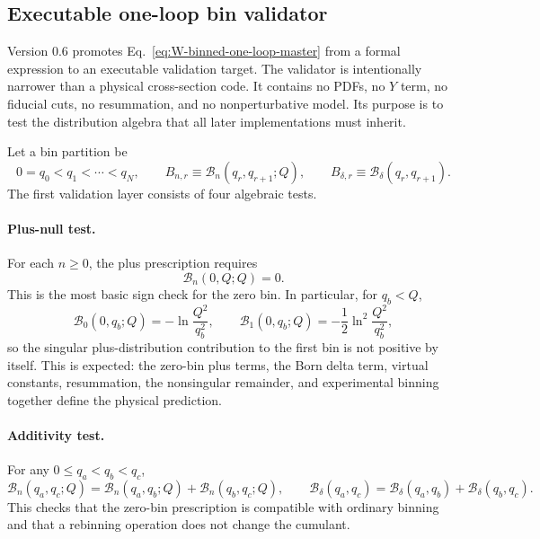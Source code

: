 \documentclass[11pt]{article}
\begin{document}
\subsection{Executable one-loop bin validator}
\label{subsec:one-loop-bin-validator}

Version 0.6 promotes Eq.~\eqref{eq:W-binned-one-loop-master} from a formal expression to
an executable validation target.  The validator is intentionally narrower than a physical
cross-section code. It contains no PDFs, no $Y$ term, no fiducial cuts, no resummation, and
no nonperturbative model. Its purpose is to test the distribution algebra that all later
implementations must inherit.

Let a bin partition be
\begin{equation}
  0=q_0<q_1<\cdots<q_N,
  \qquad
  B_{n,r}\equiv \mathcal B_n(q_r,q_{r+1};Q),
  \qquad
  B_{\delta,r}\equiv \mathcal B_\delta(q_r,q_{r+1}).
  \label{eq:bin-array-def}
\end{equation}
The first validation layer consists of four algebraic tests.

\paragraph{Plus-null test.}
For each $n\ge0$, the plus prescription requires
\begin{equation}
  \mathcal B_n(0,Q;Q)=0.
  \label{eq:plus-null-test}
\end{equation}
This is the most basic sign check for the zero bin.  In particular, for $q_b<Q$,
\begin{equation}
  \mathcal B_0(0,q_b;Q)=-\ln\frac{Q^2}{q_b^2},
  \qquad
  \mathcal B_1(0,q_b;Q)=-\frac{1}{2}\ln^2\frac{Q^2}{q_b^2},
  \label{eq:first-bin-negative}
\end{equation}
so the singular plus-distribution contribution to the first bin is not positive by itself.
This is expected: the zero-bin plus terms, the Born delta term, virtual constants,
resummation, the nonsingular remainder, and experimental binning together define the
physical prediction.

\paragraph{Additivity test.}
For any $0\le q_a<q_b<q_c$,
\begin{equation}
  \mathcal B_n(q_a,q_c;Q)
  =
  \mathcal B_n(q_a,q_b;Q)+\mathcal B_n(q_b,q_c;Q),
  \qquad
  \mathcal B_\delta(q_a,q_c)
  =
  \mathcal B_\delta(q_a,q_b)+\mathcal B_\delta(q_b,q_c).
  \label{eq:bin-additivity-test}
\end{equation}
This checks that the zero-bin prescription is compatible with ordinary binning and that a
rebinning operation does not change the cumulant.
\end{document}
